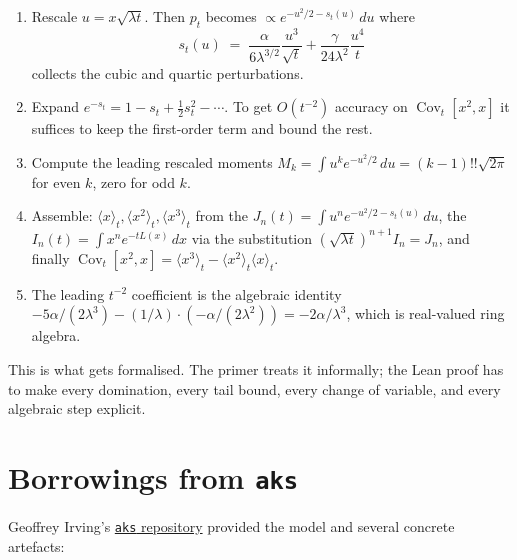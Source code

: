 \documentclass[11pt]{article}
\begin{document}
\begin{enumerate}
\item Rescale $u = x\sqrt{\lambda t}$. Then $p_t$ becomes
$\propto e^{-u^2/2 - s_t(u)}\,du$ where
\[
  s_t(u) \;=\; \frac{\alpha}{6\lambda^{3/2}}\frac{u^3}{\sqrt t}
            + \frac{\gamma}{24\lambda^2}\frac{u^4}{t}
\]
collects the cubic and quartic perturbations.
\item Expand $e^{-s_t} = 1 - s_t + \tfrac12 s_t^2 - \cdots$. To get
$O(t^{-2})$ accuracy on $\operatorname{Cov}_t[x^2,x]$ it suffices to keep
the first-order term and bound the rest.
\item Compute the leading rescaled moments
$M_k = \int u^k e^{-u^2/2}\,du = (k-1)!! \sqrt{2\pi}$ for even $k$, zero
for odd $k$.
\item Assemble: $\langle x\rangle_t, \langle x^2\rangle_t,
\langle x^3\rangle_t$ from the $J_n(t) = \int u^n e^{-u^2/2 - s_t(u)}\,du$,
the $I_n(t) = \int x^n e^{-tL(x)}\,dx$ via the substitution
$(\sqrt{\lambda t})^{n+1} I_n = J_n$, and finally
$\operatorname{Cov}_t[x^2,x] = \langle x^3\rangle_t -
 \langle x^2\rangle_t \langle x\rangle_t$.
\item The leading $t^{-2}$ coefficient is the algebraic identity
$-5\alpha/(2\lambda^3) - (1/\lambda)\cdot(-\alpha/(2\lambda^2)) =
 -2\alpha/\lambda^3$, which is real-valued ring algebra.
\end{enumerate}

This is what gets formalised. The primer treats it informally; the Lean
proof has to make every domination, every tail bound, every change of
variable, and every algebraic step explicit.

\section{Borrowings from \texttt{aks}}\label{sec:aks}

Geoffrey Irving's \href{https://github.com/girving/aks}{\texttt{aks} repository}
provided the model and several concrete artefacts:
\end{document}

